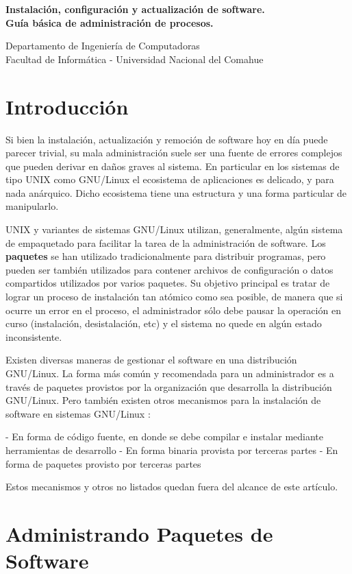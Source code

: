 \documentclass[12pt]{article}
\def\maketitle{

 \makeatletter
 {\color{bl} \centering \huge \sc \textbf{
  Instalación, configuración y actualización de software.\\ 
\large \vspace*{-8pt} \color{black} Guía básica de administración de procesos. 
 \vspace*{8pt} }\par}
 \makeatother

\makeatletter
 {\centering \small 
 	Departamento de Ingeniería de Computadoras \\
 	Facultad de Informática - Universidad Nacional del Comahue \\
 	\vspace{20pt} }
 \makeatother

}
\begin{document}
\thispagestyle{empty}
\maketitle
\setlength{\parindent}{0pt}

\section*{Introducción}

Si bien la instalación, actualización y remoción de software hoy en día
puede parecer trivial, su mala administración suele ser una fuente de 
errores complejos que pueden derivar en daños graves al sistema. 
En particular en los sistemas de tipo UNIX como GNU/Linux el ecosistema
de aplicaciones es delicado, y para nada anárquico. Dicho ecosistema tiene 
una estructura y una forma particular de manipularlo. 

UNIX y variantes de sistemas GNU/Linux utilizan, generalmente, algún
sistema de empaquetado para facilitar la tarea de la administración de software.
Los {\bf paquetes} se han utilizado tradicionalmente para distribuir programas,
pero pueden ser también utilizados para contener archivos de configuración
o datos compartidos utilizados por varios paquetes. Su objetivo principal
es tratar de lograr un proceso de instalación tan atómico como sea posible,
de manera que si ocurre un error en el proceso, el administrador
sólo debe pausar la operación en curso (instalación, desistalación, etc)
y el sistema no quede en algún estado inconsistente.

Existen diversas maneras de gestionar el software en una distribución 
GNU/Linux. La forma más común y recomendada para un administrador es a través de paquetes
provistos por la organización que desarrolla la distribución GNU/Linux.
Pero también existen otros mecanismos
para la instalación de software en sistemas GNU/Linux :

- En forma de código fuente, en donde se debe compilar e instalar mediante herramientas de desarrollo
- En forma binaria provista por terceras partes
- En forma de paquetes provisto por terceras partes

Estos mecanismos y otros no listados quedan fuera del alcance de este artículo.

\section*{Administrando Paquetes de Software}
\end{document}
